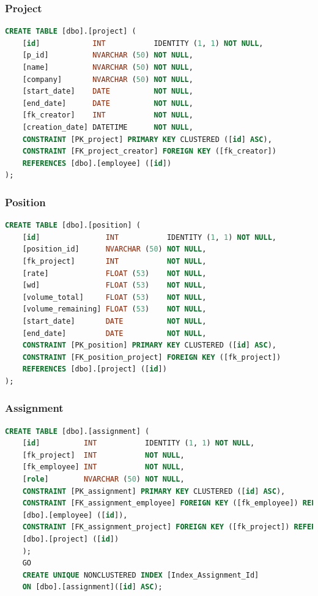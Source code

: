 \documentclass{article}
\begin{document}
\subsubsection{Project}
\begin{lstlisting}[language=Sql, caption= Create Table Statement für Project Table]
    CREATE TABLE [dbo].[project] (
    [id]            INT           IDENTITY (1, 1) NOT NULL,
    [p_id]          NVARCHAR (50) NOT NULL,
    [name]          NVARCHAR (50) NOT NULL,
    [company]       NVARCHAR (50) NOT NULL,
    [start_date]    DATE          NOT NULL,
    [end_date]      DATE          NOT NULL,
    [fk_creator]    INT           NOT NULL,
    [creation_date] DATETIME      NOT NULL,
    CONSTRAINT [PK_project] PRIMARY KEY CLUSTERED ([id] ASC),
    CONSTRAINT [FK_project_creator] FOREIGN KEY ([fk_creator]) 
    REFERENCES [dbo].[employee] ([id])
);
         \end{lstlisting}
\subsubsection{Position}
\begin{lstlisting}[language=Sql, caption= Create Table Statement für Position Table]
    CREATE TABLE [dbo].[position] (
    [id]               INT           IDENTITY (1, 1) NOT NULL,
    [position_id]      NVARCHAR (50) NOT NULL,
    [fk_project]       INT           NOT NULL,
    [rate]             FLOAT (53)    NOT NULL,
    [wd]               FLOAT (53)    NOT NULL,
    [volume_total]     FLOAT (53)    NOT NULL,
    [volume_remaining] FLOAT (53)    NOT NULL,
    [start_date]       DATE          NOT NULL,
    [end_date]         DATE          NOT NULL,
    CONSTRAINT [PK_position] PRIMARY KEY CLUSTERED ([id] ASC),
    CONSTRAINT [FK_position_project] FOREIGN KEY ([fk_project]) 
    REFERENCES [dbo].[project] ([id])
);
         \end{lstlisting}
\subsubsection{Assignment}
\begin{lstlisting}[language=Sql, caption= Create Table Statement für Assignment Table]
    CREATE TABLE [dbo].[assignment] (
    [id]          INT           IDENTITY (1, 1) NOT NULL,
    [fk_project]  INT           NOT NULL,
    [fk_employee] INT           NOT NULL,
    [role]        NVARCHAR (50) NOT NULL,
    CONSTRAINT [PK_assignment] PRIMARY KEY CLUSTERED ([id] ASC),
    CONSTRAINT [FK_assignment_employee] FOREIGN KEY ([fk_employee]) REFERENCES
    [dbo].[employee] ([id]),
    CONSTRAINT [FK_assignment_project] FOREIGN KEY ([fk_project]) REFERENCES
    [dbo].[project] ([id])
    );
    GO
    CREATE UNIQUE NONCLUSTERED INDEX [Index_Assignment_Id]
    ON [dbo].[assignment]([id] ASC);


         \end{lstlisting}
\end{document}
